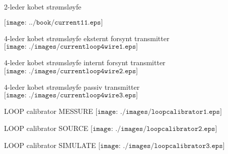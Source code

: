 \documentclass[avery5388,grid,frame]{flashcards}
\begin{document}


\begin{flashcard}{2-leder kobet strømsløyfe}

$\texttt{[image: ../book/current11.eps]}$

\end{flashcard}

\begin{flashcard}{4-leder kobet strømsløyfe eksternt forsynt transmitter}
$\texttt{[image: ./images/currentloop4wire1.eps]}$
\end{flashcard}

\begin{flashcard}{4-leder kobet strømsløyfe internt forsynt transmitter}
$\texttt{[image: ./images/currentloop4wire2.eps]}$
\end{flashcard}

\begin{flashcard}{4-leder kobet strømsløyfe passiv transmitter}
$\texttt{[image: ./images/currentloop4wire3.eps]}$
\end{flashcard}

\begin{flashcard}{LOOP calibrator MESSURE}
$\texttt{[image: ./images/loopcalibrator1.eps]}$
\end{flashcard}



\begin{flashcard}{LOOP calibrator SOURCE}
$\texttt{[image: ./images/loopcalibrator2.eps]}$
\end{flashcard}

\begin{flashcard}{LOOP calibrator SIMULATE}
$\texttt{[image: ./images/loopcalibrator3.eps]}$
\end{flashcard}
\end{document}
